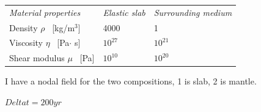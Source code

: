\begin{center}
\begin{tabular}{lll}
\textit{Material properties}& \textit{Elastic slab}  & \textit{Surrounding medium} \\ 
Density         $\rho$ \     [kg/m$^{3}$]      & 4000                    & 1     \\
Viscosity       $\eta$ \    [Pa$\cdot$ s]      & $10^{27}$                   &   $10^{21}$     \\
Shear modulus   $\mu $ \    [Pa]            & $10^{10}$                    & $10^{20}$       \\ 
\end{tabular} 
\end{center}

I have a nodal field for the two compositions, 1 is slab, 2 is mantle. 

$Delta t = 200yr$



